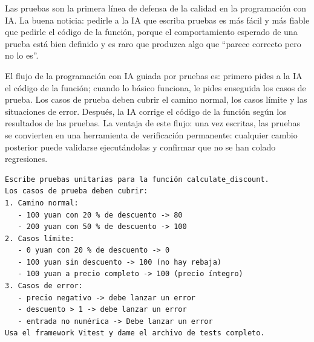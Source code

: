 


Las pruebas son la primera línea de defensa de la calidad en la programación con IA. La buena noticia: pedirle a la IA que escriba pruebas es más fácil y más fiable que pedirle el código de la función, porque el comportamiento esperado de una prueba está bien definido y es raro que produzca algo que “parece correcto pero no lo es”.

El flujo de la programación con IA guiada por pruebas es: primero pides a la IA el código de la función; cuando lo básico funciona, le pides enseguida los casos de prueba. Los casos de prueba deben cubrir el camino normal, los casos límite y las situaciones de error. Después, la IA corrige el código de la función según los resultados de las pruebas. La ventaja de este flujo: una vez escritas, las pruebas se convierten en una herramienta de verificación permanente: cualquier cambio posterior puede validarse ejecutándolas y confirmar que no se han colado regresiones.

\begin{lstlisting}
Escribe pruebas unitarias para la función calculate_discount.
Los casos de prueba deben cubrir:
1. Camino normal:
   - 100 yuan con 20 % de descuento -> 80
   - 200 yuan con 50 % de descuento -> 100
2. Casos límite:
   - 0 yuan con 20 % de descuento -> 0
   - 100 yuan sin descuento -> 100 (no hay rebaja)
   - 100 yuan a precio completo -> 100 (precio íntegro)
3. Casos de error:
   - precio negativo -> debe lanzar un error
   - descuento > 1 -> debe lanzar un error
   - entrada no numérica -> Debe lanzar un error
Usa el framework Vitest y dame el archivo de tests completo.
\end{lstlisting}

